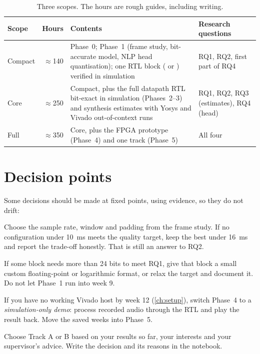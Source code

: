\begin{table}[htbp]
\centering\footnotesize
\caption{Three scopes. The hours are rough guides, including writing.}
\label{tab:plan:scope}
\begin{tabularx}{\textwidth}{@{}lrLL@{}}
\toprule
Scope & Hours & Contents & Research questions \\
\midrule
Compact & $\approx$140 & Phase~0; Phase~1 (frame study, bit-accurate model, NLP head quantisation); one RTL block ( or ) verified in simulation & RQ1, RQ2, first part of RQ4 \\
Core & $\approx$250 & Compact, plus the full datapath RTL bit-exact in simulation (Phases~2--3) and synthesis estimates with Yosys and Vivado out-of-context runs & RQ1, RQ2, RQ3 (estimates), RQ4 (head) \\
Full & $\approx$350 & Core, plus the FPGA prototype (Phase~4) and one track (Phase~5) & All four \\
\bottomrule
\end{tabularx}
\end{table}

\section{Decision points}\label{sec:plan:decisions}

Some decisions should be made at fixed points, using evidence, so they do not
drift:

\begin{description}[style=nextline,leftmargin=1.2em]
  \item[End of week 4 --- frame configuration]
  Choose the sample rate, window and padding from the frame study. If no
  configuration under \qty{10}{\ms} meets the quality target, keep the best
  under \qty{16}{\ms} and report the trade-off honestly. That is still an answer
  to RQ2.
  \item[End of week 7 --- precision (M1)]
  If some block needs more than 24 bits to meet RQ1, give that block a small
  custom floating-point or logarithmic format, or relax the target and
  document it. Do not let Phase~1 run into week 9.
  \item[Week 12 --- FPGA readiness]
  If you have no working Vivado host by week 12 (\cref{ch:setup}), switch Phase~4
  to a \emph{simulation-only demo}: process recorded audio through the RTL and
  play the result back. Move the saved weeks into Phase~5.
  \item[Week 16 --- choose the track]
  Choose Track A or B based on your results so far, your interests and your
  supervisor's advice. Write the decision and its reasons in the notebook.
\end{description}

